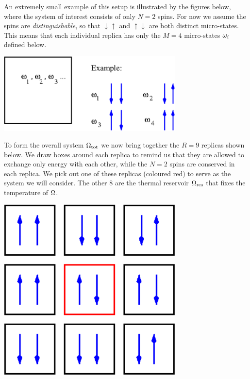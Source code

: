 An extremely small example of this setup is illustrated by the figures below, where the system of interest consists of only $N = 2$ spins.
For now we assume the spins are \textit{distinguishable}, so that $\downarrow\uparrow$ and $\uparrow\downarrow$ are both distinct micro-states.
This means that each individual replica has only the $M = 4$ micro-states $\omega_i$ defined below.
\begin{center}
  \includegraphics[width=0.7\textwidth]{figs/week03_spin-system.pdf}
\end{center}
To form the overall system $\Omega_{\text{tot}}$ we now bring together the $R = 9$ replicas shown below.
We draw boxes around each replica to remind us that they are allowed to exchange only energy with each other, while the $N = 2$ spins are conserved in each replica.
We pick out one of these replicas (coloured red) to serve as the system \Om we will consider.
The other $8$ are the thermal reservoir $\Omega_{\text{res}}$ that fixes the temperature of $\Omega$.
\begin{center}
  \includegraphics[width=0.7\textwidth]{figs/week03_spin-reservoir.pdf}
\end{center}

